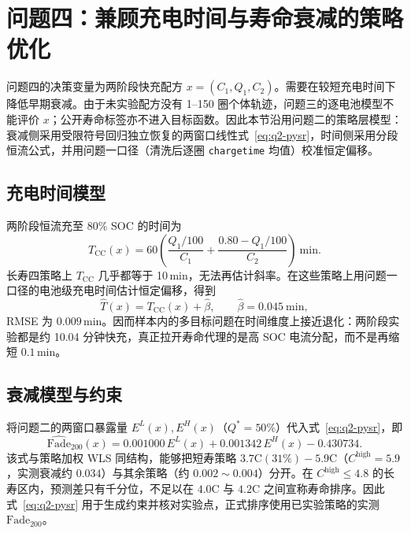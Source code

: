 \section{问题四：兼顾充电时间与寿命衰减的策略优化}

问题四的决策变量为两阶段快充配方 \(x=(C_1,Q_1,C_2)\)。需要在较短充电时间下降低早期衰减。由于未实验配方没有 1--150 圈个体轨迹，问题三的逐电池模型不能评价 \(x\)；公开寿命标签亦不进入目标函数。因此本节沿用问题二的策略层模型：衰减侧采用受限符号回归独立恢复的两窗口线性式~\eqref{eq:q2-pysr}，时间侧采用分段恒流公式，并用问题一口径（清洗后逐圈 \texttt{chargetime} 均值）校准恒定偏移。

\subsection{充电时间模型}

两阶段恒流充至 \(80\%\) SOC 的时间为
\begin{equation}
T_{\mathrm{CC}}(x)=60\left(\frac{Q_1/100}{C_1}+\frac{0.80-Q_1/100}{C_2}\right)\ \mathrm{min}.
\label{eq:q4-time}
\end{equation}
长寿四策略上 \(T_{\mathrm{CC}}\) 几乎都等于 10\,min，无法再估计斜率。在这些策略上用问题一口径的电池级充电时间估计恒定偏移，得到
\begin{equation}
\widehat T(x)=T_{\mathrm{CC}}(x)+\hat\beta,\qquad \hat\beta=0.045\ \mathrm{min},
\end{equation}
RMSE 为 \(0.009\)\,min。因而样本内的多目标问题在时间维度上接近退化：两阶段实验都是约 10.04 分钟快充，真正拉开寿命代理的是高 SOC 电流分配，而不是再缩短 \(0.1\)\,min。

\subsection{衰减模型与约束}

将问题二的两窗口暴露量 \(E^{L}(x),E^{H}(x)\)（\(Q^\ast=50\%\)）代入式~\eqref{eq:q2-pysr}，即
\begin{equation}
\widehat{\mathrm{Fade}}_{200}(x)=0.001000\,E^{L}(x)+0.001342\,E^{H}(x)-0.430734.
\label{eq:q4-pysr}
\end{equation}
该式与策略加权 WLS 同结构，能够把短寿策略 \(3.7\mathrm{C}(31\%)-5.9\mathrm{C}\)（\(C^{\mathrm{high}}=5.9\)，实测衰减约 \(0.034\)）与其余策略（约 \(0.002\sim 0.004\)）分开。在 \(C^{\mathrm{high}}\le 4.8\) 的长寿区内，预测差只有千分位，不足以在 \(4.0\mathrm{C}\) 与 \(4.2\mathrm{C}\) 之间宣称寿命排序。因此式~\eqref{eq:q2-pysr} 用于生成约束并核对实验点，正式排序使用已实验策略的实测 \(\mathrm{Fade}_{200}\)。

